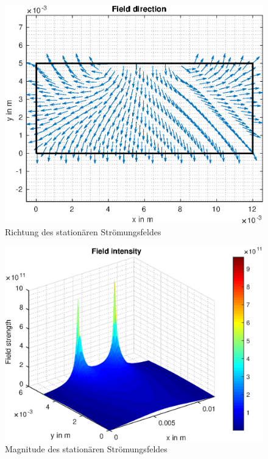 \begin{figure}[H]
	\centering
	\includegraphics[scale=1]{pics/Bsp_2/fig_3.eps}
	\caption{Richtung des stationären Strömungsfeldes}
\end{figure}

\begin{figure}[H]
	\centering
	\includegraphics[scale=1]{pics/Bsp_2/fig_4.eps}
	\caption{Magnitude des stationären Strömungsfeldes}
	\label{fig:mag_J}
\end{figure}
